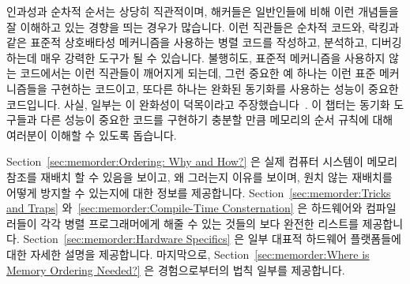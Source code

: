 
%

인과성과 순차적 순서는 상당히 직관적이며, 해커들은 일반인들에 비해 이런
개념들을 잘 이해하고 있는 경향을 띄는 경우가 많습니다.
이런 직관들은 순차적 코드와, 락킹과 같은 표준적 상호배타성 메커니즘을 사용하는
병렬 코드를 작성하고, 분석하고, 디버깅 하는데 매우 강력한 도구가 될 수
있습니다.
불행히도, 표준적 메커니즘을 사용하지 않는 코드에서는 이런 직관들이 깨어지게
되는데, 그런 중요한 예 하나는 이런 표준 메커니즘들을 구현하는 코드이고, 또다른
하나는 완화된 동기화를 사용하는 성능이 중요한 코드입니다.
사실, 일부는 이 완화성이 덕목이라고
주장했습니다~\cite{JadeAlglave2013-WeaknessIsVirtue}.
이 챕터는 동기화 도구들과 다른 성능이 중요한 코드를 구현하기 충분할 만큼
메모리의 순서 규칙에 대해 여러분이 이해할 수 있도록 돕습니다.

Section~\ref{sec:memorder:Ordering: Why and How?}
은 실제 컴퓨터 시스템이 메모리 참조를 재배치 할 수 있음을 보이고, 왜 그러는지
이유를 보이며, 원치 않는 재배치를 어떻게 방지할 수 있는지에 대한 정보를
제공합니다.
Section~\ref{sec:memorder:Tricks and Traps}
와~\ref{sec:memorder:Compile-Time Consternation}
은 하드웨어와 컴파일러들이 각각 병렬 프로그래머에게 해줄 수 있는 것들의 보다
완전한 리스트를 제공합니다.
Section~\ref{sec:memorder:Hardware Specifics}
은 일부 대표적 하드웨어 플랫폼들에 대한 자세한 설명을 제공합니다.
마지막으로, Section~\ref{sec:memorder:Where is Memory Ordering Needed?}
은 경험으로부터의 법칙 일부를 제공합니다.
\iffalse

